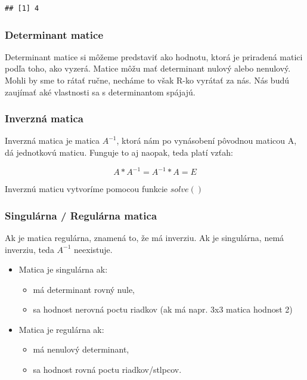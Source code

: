 \begin{verbatim}
## [1] 4
\end{verbatim}

\begin{Shaded}
\begin{Highlighting}[]
\end{Highlighting}
\end{Shaded}

\hypertarget{determinant-matice}{%
\subsubsection{Determinant matice}\label{determinant-matice}}

Determinant matice si môžeme predstaviť ako hodnotu, ktorá je priradená
matici podľa toho, ako vyzerá. Matice môžu mať determinant nulový alebo
nenulový. Mohli by sme to rátať ručne, necháme to však R-ko vyrátať za
nás. Nás budú zaujímať aké vlastnosti sa s determinantom spájajú.

\hypertarget{inverznuxe1-matica}{%
\subsubsection{Inverzná matica}\label{inverznuxe1-matica}}

Inverzná matica je matica \(A^{-1}\), ktorá nám po vynásobení pôvodnou
maticou A, dá jednotkovú maticu. Funguje to aj naopak, teda platí vzťah:

\[A * A^{-1} = A^{-1} * A = E\]

Inverznú maticu vytvoríme pomocou funkcie \(solve()\)

\hypertarget{singuluxe1rna-reguluxe1rna-matica}{%
\subsubsection{Singulárna / Regulárna
matica}\label{singuluxe1rna-reguluxe1rna-matica}}

Ak je matica regulárna, znamená to, že má inverziu. Ak je singulárna,
nemá inverziu, teda \(A^{-1}\) neexistuje.

\begin{itemize}
\tightlist
\item
  Matica je singulárna ak:

  \begin{itemize}
  \tightlist
  \item
    má determinant rovný nule,
  \item
    sa hodnost nerovná poctu riadkov (ak má napr. 3x3 matica hodnost 2)
  \end{itemize}
\item
  Matica je regulárna ak:

  \begin{itemize}
  \tightlist
  \item
    má nenulový determinant,
  \item
    sa hodnost rovná poctu riadkov/stlpcov.
  \end{itemize}
\end{itemize}

